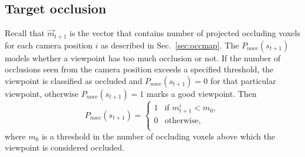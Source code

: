 \documentclass[10pt,twocolumn,letterpaper]{article}
\begin{document}
\subsection{Target occlusion} \label{sec:target-occ}
Recall that $\vec{m}_{t+1}$ is the vector that contains number of projected occluding voxels for each camera position $i$ as described in Sec.~\ref{sec:occmap}.
The $P_{nocc}(s_{t+1})$ models whether a viewpoint has too much occlusion or not. 
If the number of occlusions seen from the camera position exceeds a specified threshold, the viewpoint is classified as occluded and $P_{nocc}(s_{t+1})=0$ for that particular viewpoint, otherwise $P_{nocc}(s_{t+1}) = 1$ marks a good viewpoint.
Then 
\begin{equation}  
  P_{nocc}(s_{t+1}) =  
     \begin{cases}
       1 & \text{if} \,\,m_{t+1}^i < m_{0},\\
       0 & \text{otherwise},\\
     \end{cases}
\end{equation}
where $m_{0}$ is a threshold in the number of occluding voxels above which the viewpoint is considered occluded.
\end{document}
